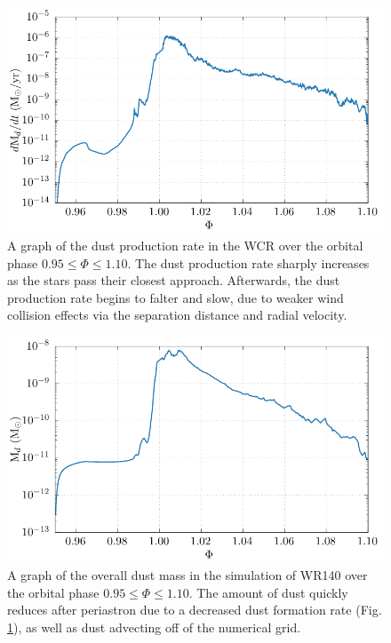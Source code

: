 \begin{figure}
  \centering
  \includegraphics{assets/wr140-dust_rate.pdf}
  \caption{A graph of the dust production rate in the WCR over the orbital phase $0.95 \leq \Phi \leq 1.10$. The dust production rate sharply increases as the stars pass their closest approach. Afterwards, the dust production rate begins to falter and slow, due to weaker wind collision effects via the separation distance and radial velocity.}
  \label{fig:wr140-dustproduction}
\end{figure}

\begin{figure}
  \centering
  \includegraphics{assets/wr140-m_dust.pdf}
  \caption{A graph of the overall dust mass in the simulation of WR140 over the orbital phase $0.95 \leq \Phi \leq 1.10$. The amount of dust quickly reduces after periastron due to a decreased dust formation rate (Fig. \ref{fig:wr140-dustproduction}), as well as dust advecting off of the numerical grid.}
  \label{fig:wr140-dustmass}
\end{figure}

